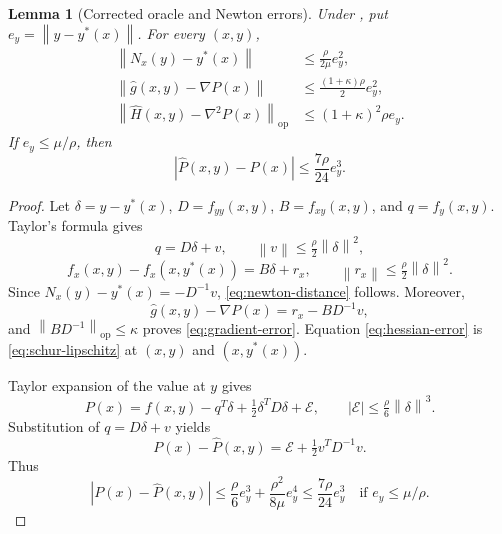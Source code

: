 \documentclass[11pt]{article}
\numberwithin{equation}{section}
\newtheorem{lemma}[assumption]{Lemma}
\newcommand{\norm}[1]{\left\lVert#1\right\rVert}
\newcommand{\op}{\mathrm{op}}
\begin{document}
\begin{lemma}[Corrected oracle and Newton errors]\label{lem:oracle-errors}
Under , put $e_y=\norm{y-y^*(x)}$.
For every $(x,y)$,
\begin{align}
 \norm{N_x(y)-y^*(x)}&\le\frac\rho{2\mu}e_y^2,
 \label{eq:newton-distance}\\
 \norm{\widehat g(x,y)-\nabla P(x)}
 &\le\frac{(1+\kappa)\rho}{2}e_y^2,
 \label{eq:gradient-error}\\
 \norm{\widehat H(x,y)-\nabla^2P(x)}_{\op}
 &\le(1+\kappa)^2\rho e_y.
 \label{eq:hessian-error}
\end{align}
If $e_y\le\mu/\rho$, then
\begin{equation}\label{eq:value-error}
 |\widehat P(x,y)-P(x)|\le\frac{7\rho}{24}e_y^3.
\end{equation}
\end{lemma}

\begin{proof}
Let $\delta=y-y^*(x)$, $D=f_{yy}(x,y)$, $B=f_{xy}(x,y)$,
and $q=f_y(x,y)$. Taylor's formula gives
\[
 q=D\delta+v,\qquad \norm v\le\tfrac\rho2\norm\delta^2,
\]
\[
 f_x(x,y)-f_x(x,y^*(x))=B\delta+r_x,
 \qquad\norm{r_x}\le\tfrac\rho2\norm\delta^2.
\]
Since $N_x(y)-y^*(x)=-D^{-1}v$,
\eqref{eq:newton-distance} follows. Moreover,
\[
 \widehat g(x,y)-\nabla P(x)=r_x-BD^{-1}v,
\]
and $\norm{BD^{-1}}_{\op}\le\kappa$ proves
\eqref{eq:gradient-error}. Equation \eqref{eq:hessian-error}
is \eqref{eq:schur-lipschitz} at $(x,y)$ and $(x,y^*(x))$.

Taylor expansion of the value at $y$ gives
\[
 P(x)=f(x,y)-q^T\delta+\tfrac12\delta^TD\delta+\mathcal E,
 \qquad |\mathcal E|\le\tfrac\rho6\norm\delta^3.
\]
Substitution of $q=D\delta+v$ yields
\[
 P(x)-\widehat P(x,y)=\mathcal E+\tfrac12v^TD^{-1}v.
\]
Thus
\[
 |P(x)-\widehat P(x,y)|
 \le\frac\rho6e_y^3+\frac{\rho^2}{8\mu}e_y^4
 \le\frac{7\rho}{24}e_y^3
 \quad\text{if }e_y\le\mu/\rho.
\]
\end{proof}
\end{document}
